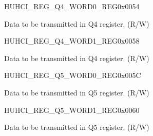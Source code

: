\begin{register}{H}{UHCI\_REG\_Q4\_WORD0\_REG}{0x0054}\label{regdesc:UHCIREGQ4WORD0REG}
%
\regnewline%
\begin{regdesc}\begin{reglist}
\label{fielddesc:UHCISENDQ4WORD0}\item [UHCI\_SEND\_Q4\_WORD0] Data to be transmitted in Q4 register. (R/W)
\end{reglist}\end{regdesc}
\end{register}


\begin{register}{H}{UHCI\_REG\_Q4\_WORD1\_REG}{0x0058}\label{regdesc:UHCIREGQ4WORD1REG}
%
\regnewline%
\begin{regdesc}\begin{reglist}
\label{fielddesc:UHCISENDQ4WORD1}\item [UHCI\_SEND\_Q4\_WORD1] Data to be transmitted in Q4 register. (R/W)
\end{reglist}\end{regdesc}
\end{register}


\begin{register}{H}{UHCI\_REG\_Q5\_WORD0\_REG}{0x005C}\label{regdesc:UHCIREGQ5WORD0REG}
%
\regnewline%
\begin{regdesc}\begin{reglist}
\label{fielddesc:UHCISENDQ5WORD0}\item [UHCI\_SEND\_Q5\_WORD0] Data to be transmitted in Q5 register. (R/W)
\end{reglist}\end{regdesc}
\end{register}


\begin{register}{H}{UHCI\_REG\_Q5\_WORD1\_REG}{0x0060}\label{regdesc:UHCIREGQ5WORD1REG}
%
\regnewline%
\begin{regdesc}\begin{reglist}
\label{fielddesc:UHCISENDQ5WORD1}\item [UHCI\_SEND\_Q5\_WORD1] Data to be transmitted in Q5 register. (R/W)
\end{reglist}\end{regdesc}
\end{register}


